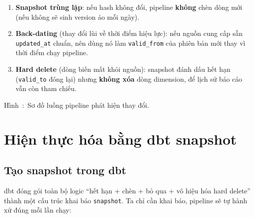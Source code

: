 \documentclass[12pt]{article}
\newcounter{hinh}
\newcommand{\capfig}[1]{%
  \refstepcounter{hinh}%
    Hình~\thehinh:~#1
}
\begin{document}
\begin{enumerate}
    \item \textbf{Snapshot trùng lặp}: nếu hash không đổi, pipeline \textbf{không} chèn dòng mới (nếu không sẽ sinh version ảo mỗi ngày).
    \item \textbf{Back-dating} (thay đổi lùi về thời điểm hiệu lực): nếu nguồn cung cấp sẵn \texttt{updated\_at} chuẩn, nên dùng nó làm \texttt{valid\_from} của phiên bản mới thay vì thời điểm chạy pipeline.
    \item \textbf{Hard delete} (dòng biến mất khỏi nguồn): snapshot đánh dấu hết hạn (\texttt{valid\_to} đóng lại) nhưng \textbf{không xóa} dòng dimension, để lịch sử báo cáo vẫn còn tham chiếu.
\end{enumerate}



\begin{figurecaptionmodern}
\capfig{Sơ đồ luồng pipeline phát hiện thay đổi.}
\end{figurecaptionmodern}

\section{Hiện thực hóa bằng dbt snapshot}

\subsection{Tạo snapshot trong dbt}

dbt đóng gói toàn bộ logic ``hết hạn + chèn + bỏ qua + vô hiệu hóa hard delete'' thành một cấu trúc khai báo \texttt{snapshot}. Ta chỉ cần khai báo, pipeline sẽ tự hành xử đúng mỗi lần chạy:

\end{document}
